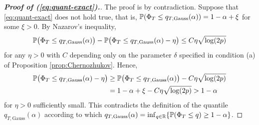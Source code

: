 \documentclass[a4paper,12pt]{article}
\numberwithin{equation}{section}
\begin{document}
\begin{proof}[\textnormal{\textbf{Proof of (\ref{eq:quant-exact}).}}]
The proof is by contradiction. Suppose that \eqref{eq:quant-exact} does not hold true, that is, $\mathbb{P}(\Phi_T \le q_{T,\text{Gauss}}(\alpha)) = 1-\alpha + \xi$ for some $\xi > 0$. By Nazarov's inequality, 
\begin{equation*}
\mathbb{P} \big(\Phi_T \le q_{T,\text{Gauss}}(\alpha)\big) - \mathbb{P}\big(\Phi_T \le q_{T,\text{Gauss}}(\alpha) - \eta\big) \le C \eta \sqrt{\log (2p)} 
\end{equation*}
for any $\eta > 0$ with $C$ depending only on the parameter $\delta$ specified in condition (a) of Proposition \ref{prop:Chernozhukov}. Hence, 
\begin{align*}
\mathbb{P} \big(\Phi_T \le q_{T,\text{Gauss}}(\alpha) - \eta\big) 
 & \ge \mathbb{P}\big(\Phi_T \le q_{T,\text{Gauss}}(\alpha) \big) - C \eta \sqrt{\log(2p)} \\
 & = 1-\alpha + \xi - C \eta \sqrt{\log(2p)} > 1-\alpha
\end{align*}
for $\eta > 0$ sufficiently small. This contradicts the definition of the quantile $q_{T,\text{Gauss}}(\alpha)$ according to which $q_{T,\text{Gauss}}(\alpha) = \inf_{q \in \mathbb{R}} \{ \mathbb{P}(\Phi_T \le q) \ge 1-\alpha \}$. 
\end{proof}
\end{document}
